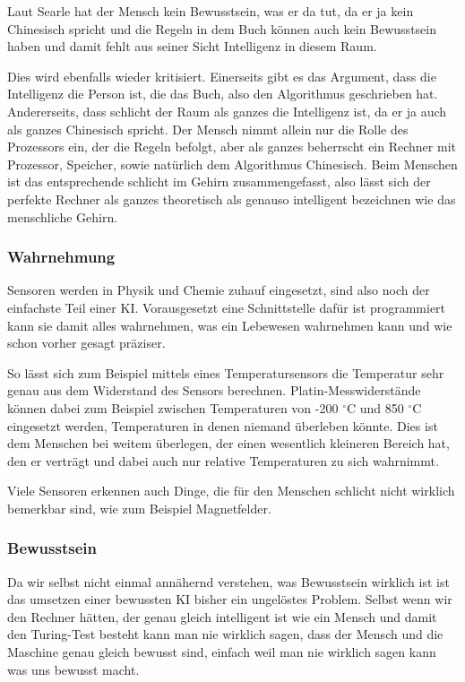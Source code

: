 Laut Searle hat der Mensch kein Bewusstsein, was er da tut, da er ja kein Chinesisch spricht und die Regeln in dem Buch können auch kein Bewusstsein haben und damit fehlt aus seiner Sicht Intelligenz in diesem Raum.

Dies wird ebenfalls wieder kritisiert.
Einerseits gibt es das Argument, dass die Intelligenz die Person ist, die das Buch, also den Algorithmus geschrieben hat.
Andererseits, dass schlicht der Raum als ganzes die Intelligenz ist, da er ja auch als ganzes Chinesisch spricht.
Der Mensch nimmt allein nur die Rolle des Prozessors ein, der die Regeln befolgt, aber als ganzes beherrscht ein Rechner mit Prozessor, Speicher, sowie natürlich dem Algorithmus Chinesisch.
Beim Menschen ist das entsprechende schlicht im Gehirn zusammengefasst, also lässt sich der perfekte Rechner als ganzes theoretisch als genauso intelligent bezeichnen wie das menschliche Gehirn.

\subsubsection{Wahrnehmung}
Sensoren werden in Physik und Chemie zuhauf eingesetzt, sind also noch der einfachste Teil einer KI.
Vorausgesetzt eine Schnittstelle dafür ist programmiert kann sie damit alles wahrnehmen, was ein Lebewesen wahrnehmen kann und wie schon vorher gesagt präziser.

So lässt sich zum Beispiel mittels eines Temperatursensors die Temperatur sehr genau aus dem Widerstand des Sensors berechnen.
Platin-Messwiderstände können dabei zum Beispiel zwischen Temperaturen von -200 $^\circ$C und 850 $^\circ$C eingesetzt werden, Temperaturen in denen niemand überleben könnte.
Dies ist dem Menschen bei weitem überlegen, der einen wesentlich kleineren Bereich hat, den er verträgt und dabei auch nur relative Temperaturen zu sich wahrnimmt.

Viele Sensoren erkennen auch Dinge, die für den Menschen schlicht nicht wirklich bemerkbar sind, wie zum Beispiel Magnetfelder.

\subsubsection{Bewusstsein}
Da wir selbst nicht einmal annähernd verstehen, was Bewusstsein wirklich ist ist das umsetzen einer bewussten KI bisher ein ungelöstes Problem.
Selbst wenn wir den Rechner hätten, der genau gleich intelligent ist wie ein Mensch und damit den Turing-Test besteht kann man nie wirklich sagen, dass der Mensch und die Maschine genau gleich bewusst sind, einfach weil man nie wirklich sagen kann was uns bewusst macht.

